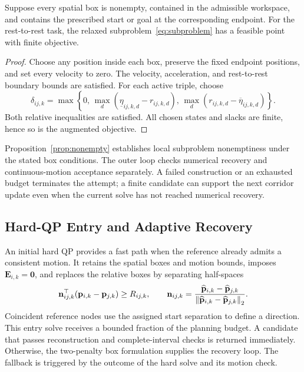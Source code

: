 \begin{Proposition}
\label{prop:nonempty}
Suppose every spatial box is nonempty, contained in the admissible workspace, and contains the prescribed start or goal at the corresponding endpoint. For the rest-to-rest task, the relaxed subproblem~\eqref{eq:subproblem} has a feasible point with finite objective.
\end{Proposition}
\begin{proof}
Choose any position inside each box, preserve the fixed endpoint positions, and set every velocity to zero. The velocity, acceleration, and rest-to-rest boundary bounds are satisfied. For each active triple, choose
\begin{equation}
 \delta_{ij,k}=\max\!\left\{0,\,
 \max_d(\underline{\eta}_{ij,k,d}-r_{ij,k,d}),\,
 \max_d(r_{ij,k,d}-\overline{\eta}_{ij,k,d})\right\}.
 \label{eq:feasiblepoint}
\end{equation}
Both relative inequalities are satisfied. All chosen states and slacks are finite, hence so is the augmented objective.
\end{proof}
Proposition~\ref{prop:nonempty} establishes local subproblem nonemptiness under the stated box conditions. The outer loop checks numerical recovery and continuous-motion acceptance separately. A failed construction or an exhausted budget terminates the attempt; a finite candidate can support the next corridor update even when the current solve has not reached numerical recovery.

\subsection{Hard-QP Entry and Adaptive Recovery}
An initial hard QP provides a fast path when the reference already admits a consistent motion. It retains the spatial boxes and motion bounds, imposes $\mathbf E_{i,k}=\mathbf0$, and replaces the relative boxes by separating half-spaces
\begin{equation}
 \mathbf n_{ij,k}^{\top}(\mathbf{p}_{i,k}-\mathbf{p}_{j,k})\geq R_{ij,k},\qquad
 \mathbf n_{ij,k}=\frac{\widehat{\mathbf{p}}_{i,k}-\widehat{\mathbf{p}}_{j,k}}
 {\left\lVert \widehat{\mathbf{p}}_{i,k}-\widehat{\mathbf{p}}_{j,k}\right\rVert_2}.
 \label{eq:hardentry}
\end{equation}
Coincident reference nodes use the assigned start separation to define a direction. This entry solve receives a bounded fraction of the planning budget. A candidate that passes reconstruction and complete-interval checks is returned immediately. Otherwise, the two-penalty box formulation supplies the recovery loop. The fallback is triggered by the outcome of the hard solve and its motion check.

